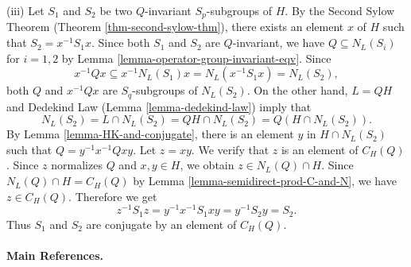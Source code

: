 \begin{sketch}
		(iii) Let $S_1$ and $S_2$ be two $Q$-invariant $S_p$-subgroups of $H$. By the Second Sylow Theorem (Theorem \ref{thm-second-sylow-thm}), there exists an element $x$ of $H$ such that $S_2 = x^{-1}S_1x$. Since both $S_1$ and $S_2$ are $Q$-invariant, we have $Q \subseteq N_L(S_i)$ for $i=1,2$ by Lemma \ref{lemma-operator-group-invariant-eqv}. Since
		$$x^{-1}Qx \subseteq x^{-1}N_L(S_1)x = N_L(x^{-1}S_1x) = N_L(S_2),$$
		both $Q$ and $x^{-1}Qx$ are $S_q$-subgroups of $N_L(S_2)$.  On the other hand, $L = QH$ and Dedekind Law (Lemma \ref{lemma-dedekind-law}) imply that
		$$N_L(S_2) = L \cap N_L(S_2) = QH \cap N_L(S_2) = Q(H \cap N_L(S_2)).$$
		By Lemma \ref{lemma-HK-and-conjugate}, there is an element $y$ in $H \cap N_L(S_2)$ such that $Q = y^{-1}x^{-1}Qxy$. Let $z = xy$. We verify that $z$ is an element of $C_H(Q)$. Since $z$ normalizes $Q$ and $x,y\in H$, we obtain $z \in N_L(Q) \cap H$. Since $N_L(Q) \cap H = C_H(Q)$ by Lemma \ref{lemma-semidirect-prod-C-and-N}, we have $z \in C_H(Q)$.  Therefore we get
		$$z^{-1}S_1z = y^{-1}x^{-1}S_1xy =y^{-1}S_2y = S_2.$$
		Thus $S_1$ and $S_2$ are conjugate by an element of $C_H(Q)$.
\end{sketch} 


\paragraph{Main References.} \cite{DummitFoote2004,Suzuki1982,Rotman1995,Alperin1995,Dixon1996}
